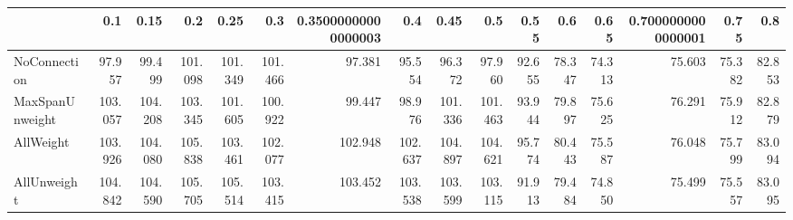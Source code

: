 \begin{tabular}{lrrrrrrrrrrrrrrr}
\toprule
{} &     0.1 &    0.15 &     0.2 &    0.25 &     0.3 & 0.35000000000000003 &     0.4 &    0.45 &     0.5 &   0.55 &    0.6 &   0.65 & 0.7000000000000001 &   0.75 &    0.8 \\
\midrule
NoConnection    &  97.957 &  99.499 & 101.098 & 101.349 & 101.466 &              97.381 &  95.554 &  96.372 &  97.960 & 92.655 & 78.347 & 74.313 &             75.603 & 75.382 & 82.853 \\
MaxSpanUnweight & 103.057 & 104.208 & 103.345 & 101.605 & 100.922 &              99.447 &  98.976 & 101.336 & 101.463 & 93.944 & 79.897 & 75.625 &             76.291 & 75.912 & 82.879 \\
AllWeight       & 103.926 & 104.080 & 105.838 & 103.461 & 102.077 &             102.948 & 102.637 & 104.897 & 104.621 & 95.774 & 80.443 & 75.587 &             76.048 & 75.799 & 83.094 \\
AllUnweight     & 104.842 & 104.590 & 105.705 & 105.514 & 103.415 &             103.452 & 103.538 & 103.599 & 103.115 & 91.913 & 79.484 & 74.850 &             75.499 & 75.557 & 83.095 \\
\bottomrule
\end{tabular}
